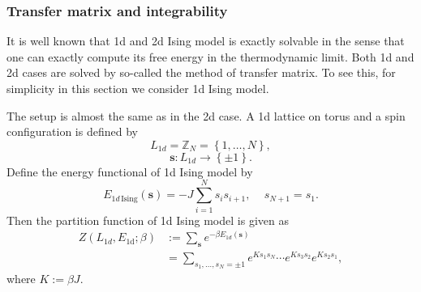 \subsubsection{Transfer matrix and integrability}

It is well known that 1d and 2d Ising model is exactly solvable in
the sense that one can exactly compute its free energy in the thermodynamic
limit. Both 1d and 2d cases are solved by so-called the method of
transfer matrix. To see this, for simplicity in this section we consider
1d Ising model.

The setup is almost the same as in the 2d case. A 1d lattice on torus
and a spin configuration is defined by
\begin{equation}
L_{1d}  =  \mathbb{Z}_{N}  =  \left\{ 1,\ldots,N\right\} ,
\end{equation}
%
\begin{equation}
\mathbf{s}  :  L_{1d}  \longrightarrow  \left\{ \pm1\right\} .
\end{equation}
Define the energy functional of 1d Ising model by
\begin{equation}
  E_{1d\,\mathrm{Ising}}\left(\mathbf{s}\right)  =  -J\sum_{i=1}^{N}s_{i}s_{i+1},\quad\,s_{N+1}=s_{1}.
\end{equation}
 Then the partition function of 1d Ising model is given as
\begin{align}
  Z\left(L_{1d},E_{\mathrm{1d}};\beta\right)
  & :=  \sum_{\mathbf{s}}  e^{-\beta E_{1d}\left(\mathbf{s}\right)}\nonumber \\
  & =   \sum_{s_{1},\ldots,s_{N}=\pm1}  e^{Ks_{1}s_{N}}  \cdots  e^{Ks_{3}s_{2}}e^{Ks_{2}s_{1}},
\end{align}
 where $K:=\beta J$.


